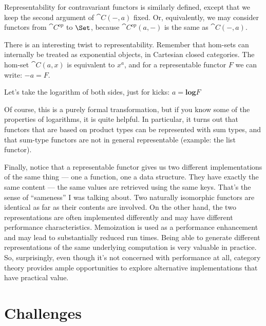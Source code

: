 Representability for contravariant functors is similarly defined, except
that we keep the second argument of $\cat{C}(-, a)$ fixed. Or,
equivalently, we may consider functors from $\cat{C}^{op}$
to $\Set$, because $\cat{C}^{op}(a, -)$ is the same as
$\cat{C}(-, a)$.

There is an interesting twist to representability. Remember that
hom-sets can internally be treated as exponential objects, in Cartesian
closed categories. The hom-set $\cat{C}(a, x)$ is equivalent to
$x^a$, and for a representable functor $F$ we can write: $-a = F$.

Let's take the logarithm of both sides, just for kicks: $a = \mathbf{log}F$

Of course, this is a purely formal transformation, but if you know some
of the properties of logarithms, it is quite helpful. In particular, it
turns out that functors that are based on product types can be
represented with sum types, and that sum-type functors are not in
general representable (example: the list functor).

Finally, notice that a representable functor gives us two different
implementations of the same thing --- one a function, one a data
structure. They have exactly the same content --- the same values are
retrieved using the same keys. That's the sense of ``sameness'' I was
talking about. Two naturally isomorphic functors are identical as far as
their contents are involved. On the other hand, the two representations
are often implemented differently and may have different performance
characteristics. Memoization is used as a performance enhancement and
may lead to substantially reduced run times. Being able to generate
different representations of the same underlying computation is very
valuable in practice. So, surprisingly, even though it's not concerned
with performance at all, category theory provides ample opportunities to
explore alternative implementations that have practical value.

\section{Challenges}


